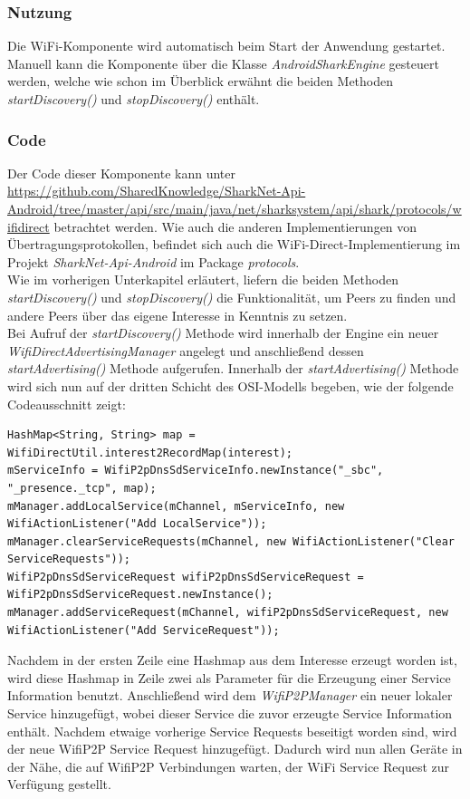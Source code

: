 \subsubsection{Nutzung}
Die WiFi-Komponente wird automatisch beim Start der Anwendung gestartet. Manuell kann die Komponente über die Klasse \textit{AndroidSharkEngine} gesteuert werden, welche wie schon im Überblick erwähnt die beiden Methoden \textit{startDiscovery()} und \textit{stopDiscovery()} enthält.


\subsubsection{Code}
Der Code dieser Komponente kann unter \url{https://github.com/SharedKnowledge/SharkNet-Api-Android/tree/master/api/src/main/java/net/sharksystem/api/shark/protocols/wifidirect} betrachtet werden. Wie auch die anderen Implementierungen von Über\-tra\-gungs\-pro\-to\-kol\-len, befindet sich auch die WiFi-Direct-Implementierung im Projekt \textit{SharkNet-Api-Android} im Package \textit{protocols}.
\\Wie im vorherigen Unterkapitel erläutert, liefern die beiden Methoden \textit{startDiscovery()} und \textit{stopDiscovery()} die Funktionalität, um Peers zu finden und andere Peers über das eigene Interesse in Kenntnis zu setzen. 
\\Bei Aufruf der \textit{startDiscovery()} Methode wird innerhalb der Engine ein neuer \textit{WifiDirectAdvertisingManager} angelegt und anschließend dessen \textit{startAdvertising()} Methode aufgerufen. Innerhalb der \textit{startAdvertising()} Methode wird sich nun auf der dritten Schicht des OSI-Modells begeben, wie der folgende Codeausschnitt zeigt:\newpage
\lstset{language=Java, caption=Hinzufügung des Services, label=DescriptiveLabel, numbers=left, numbersep=1em, breaklines=true, basicstyle=\small}
\begin{lstlisting}
HashMap<String, String> map = WifiDirectUtil.interest2RecordMap(interest);
mServiceInfo = WifiP2pDnsSdServiceInfo.newInstance("_sbc", "_presence._tcp", map);
mManager.addLocalService(mChannel, mServiceInfo, new WifiActionListener("Add LocalService"));
mManager.clearServiceRequests(mChannel, new WifiActionListener("Clear ServiceRequests"));
WifiP2pDnsSdServiceRequest wifiP2pDnsSdServiceRequest = WifiP2pDnsSdServiceRequest.newInstance();
mManager.addServiceRequest(mChannel, wifiP2pDnsSdServiceRequest, new WifiActionListener("Add ServiceRequest"));
\end{lstlisting}
Nachdem in der ersten Zeile eine Hashmap aus dem Interesse erzeugt worden ist, wird diese Hashmap in Zeile zwei als Parameter für die Erzeugung einer Service Information benutzt. Anschließend wird dem \textit{WifiP2PManager} ein neuer lokaler Service hinzugefügt, wobei dieser Service die zuvor erzeugte Service Information enthält. Nachdem etwaige vorherige Service Requests beseitigt worden sind, wird der neue WifiP2P Service Request hinzugefügt. Dadurch wird nun allen Geräte in der Nähe, die auf WifiP2P Verbindungen warten, der WiFi Service Request zur Verfügung gestellt.
